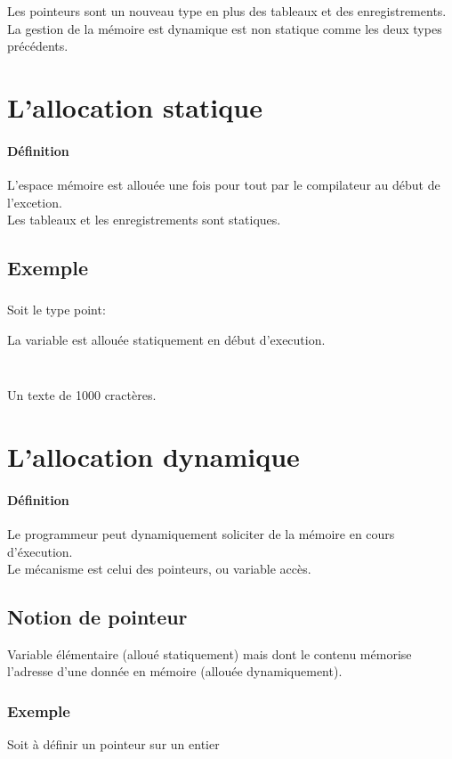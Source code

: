Les pointeurs sont un nouveau type en plus des tableaux et des enregistrements.\\ 
La gestion de la mémoire est dynamique est non statique comme les deux types précédents.
\section{L'allocation statique}
	\paragraph{Définition}
		L'espace mémoire est allouée une fois pour tout par le compilateur au début de l'excetion.\\
		Les tableaux et les enregistrements sont statiques. 
	\subsection{Exemple}
		\subsubsection{}
			Soit le type point:	
			
			La variable est allouée statiquement en début d'execution. \\ \\
			
		\subsubsection{}
			Un texte de 1000 cractères.
			
			
\section{L'allocation dynamique}
	\paragraph{Définition}
		Le programmeur peut dynamiquement soliciter de la mémoire en cours d'éxecution. \\
		Le mécanisme est celui des pointeurs, ou variable accès.
	\subsection{Notion de pointeur}
		Variable élémentaire (alloué statiquement) mais dont le contenu mémorise l'adresse d'une donnée en mémoire (allouée dynamiquement).
		\subsubsection{Exemple}
			Soit à définir un pointeur sur un entier
			
%			
